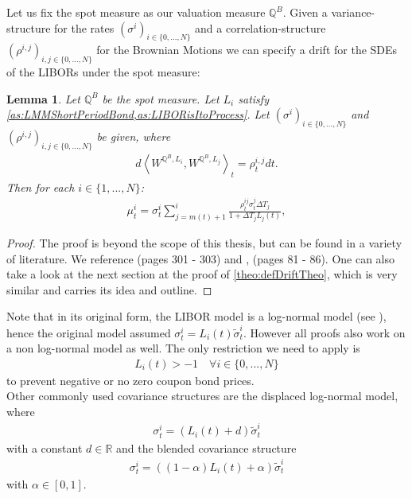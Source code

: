 \documentclass[12pt]{article}
\newtheorem{lemma}[theorem]{Lemma}
\begin{document}
	Let us fix the spot measure as our valuation measure $\mathbb{Q}^B$.
	Given a variance-structure for the rates $(\sigma^i)_{i\in\{0,...,N\}}$ and a correlation-structure $(\rho^{i,j})_{i,j \in \{0,...,N\}}$ for the Brownian Motions
	we can specify a drift for the SDEs of the LIBORs under the spot measure:
	\begin{lemma}\label{lem:LMMDriftSpec}
		Let $\mathbb{Q}^B$ be the spot measure.
		Let $L_i$ satisfy \cref{as:LMMShortPeriodBond,as:LIBORisItoProcess}. Let $(\sigma^i)_{i\in\{0,...,N\}}$ and $(\rho^{i,j})_{i,j \in \{0,...,N\}}$ be given, where
		\begin{align*}
			d\left\langle W^{\mathbb{Q}^B, L_i}, W^{\mathbb{Q}^B, L_j} \right\rangle_t = \rho^{i,j}_t dt.
		\end{align*}
		Then for each $i \in \{1, ..., N\}$:
		\begin{align*}
			\mu^{i}_t = \sigma^{i}_t\sum_{j=m(t)+1}^{i}\frac{\rho^{i j}_t \sigma^{j}_t\Delta T_j}{1 + \Delta T_j L_j(t)},
		\end{align*}
	\end{lemma}
	\begin{proof}
		The proof is beyond the scope of this thesis, but can be found in a variety of literature. We reference \cite{FriesBook} (pages 301 - 303) and \cite{fima3Lecture}, (pages 81 - 86). One can also take a look at the next section at the proof of \cref{theo:defDriftTheo}, which is very similar  and carries its idea and outline.
	\end{proof}
	Note that in its original form, the LIBOR model is a log-normal model (see \cite{FriesBook}), hence the original model assumed $\sigma^i_t = L_i(t)\tilde{\sigma}^i_t$. However all proofs also work on a non log-normal model as well. The only restriction we need to apply is
	\begin{align*}
		L_i(t) > -1 \quad \forall i \in \{0,...,N\}
	\end{align*}
	to prevent negative or no zero coupon bond prices.\\
	Other commonly used covariance structures are the displaced log-normal model, where
	\begin{align*}
		\sigma^i_t = \left(L_i(t) + d\right)\tilde{\sigma}^i_t
	\end{align*}
	with a constant $d\in \mathbb{R}$ and the blended covariance structure
	\begin{align*}
		\sigma^i_t = \left((1-\alpha) L_i(t) + \alpha\right)\tilde{\sigma}^i_t
	\end{align*}
	with $\alpha \in \left[0, 1\right]$.
\end{document}
